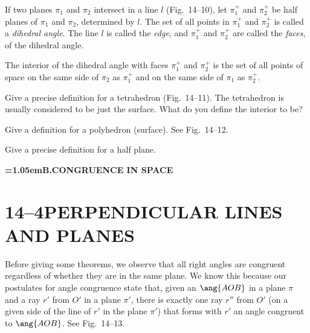 \documentclass[11pt]{book}
\theoremstyle{bkplain}
\theoremstyle{XIplainnote}
\theoremstyle{bkplain}
\newcommand{\XIVpart}[1]{%
  \par\addvspace{1.5\baselineskip}\nopagebreak
  \begin{center}\bfseries\spaceskip=1.05em\relax #1\end{center}%
  \nopagebreak\addvspace{0.8\baselineskip}}
\theoremstyle{bkplain}
\begin{document}
\FIGXIVEIGHTNINE

\begin{definition}
If two planes $\pi_1$ and $\pi_2$ intersect in a line $l$ (Fig.~14--10), let
$\pi_1^+$ and $\pi_2^+$ be half planes of $\pi_1$ and $\pi_2$, determined by
$l$. The set of all points in $\pi_1^+$ and $\pi_2^+$ is called a
\emph{dihedral angle}. The line $l$ is called the \emph{edge}, and $\pi_1^+$ and
$\pi_2^+$ are called the \emph{faces}, of the dihedral angle.
\end{definition}

\FIGXIVTEN

\begin{definition}
The interior of the dihedral angle with faces $\pi_1^+$ and $\pi_2^+$ is the set
of all points of space on the same side of $\pi_2$ as $\pi_1^+$ and on the same
side of $\pi_1$ as $\pi_2^+$.
\end{definition}

\begin{exercisecols}
\begin{exlist}
\item Give a precise definition for a tetrahedron (Fig.~14--11). The
      tetrahedron is usually considered to be just the surface. What do you
      define the interior to be?
\exfig{\FIGXIVELEVEN}
\item Give a definition for a polyhedron (surface). See Fig.~14--12.
\exfig{\FIGXIVTWELVE}
\item Give a precise definition for a half plane.
\end{exlist}
\end{exercisecols}

\XIVpart{B.\quad CONGRUENCE IN SPACE}

\section*{14--4\quad PERPENDICULAR LINES\\AND PLANES}

Before giving some theorems, we observe that all right angles are congruent
regardless of whether they are in the same plane. We know this because our
postulates for angle congruence state that, given an $\ang{AOB}$ in a plane
$\pi$ and a ray $r'$ from $O'$ in a plane $\pi'$, there is exactly one ray $r''$
from $O'$ (on a given side of the line of $r'$ in the plane $\pi'$) that forms
with $r'$ an angle congruent to $\ang{AOB}$. See Fig.~14--13.
\end{document}
